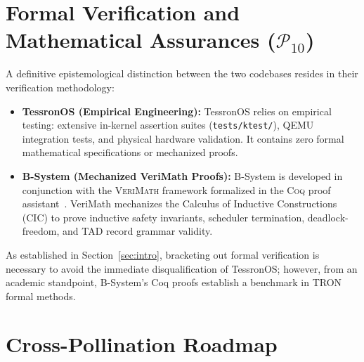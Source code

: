 \documentclass[10pt,journal,compsoc,twocolumn]{article}
\begin{document}
\section{Formal Verification and Mathematical Assurances ($\mathcal{P}_{10}$)}
\label{sec:formal}

A definitive epistemological distinction between the two codebases resides in their verification methodology:
\begin{itemize}[leftmargin=*]
    \item \textbf{TessronOS (Empirical Engineering):} TessronOS relies on empirical testing: extensive in-kernel assertion suites (\texttt{tests/ktest/}), QEMU integration tests, and physical hardware validation. It contains zero formal mathematical specifications or mechanized proofs.
    \item \textbf{B-System (Mechanized VeriMath Proofs):} B-System is developed in conjunction with the \textsc{VeriMath} framework formalized in the \textsc{Coq} proof assistant~\cite{sokhatsky2026verimath}. VeriMath mechanizes the Calculus of Inductive Constructions (CIC) to prove inductive safety invariants, scheduler termination, deadlock-freedom, and TAD record grammar validity.
\end{itemize}

As established in Section~\ref{sec:intro}, bracketing out formal verification is necessary to avoid the immediate disqualification of TessronOS; however, from an academic standpoint, B-System's Coq proofs establish a benchmark in TRON formal methods.

\section{Cross-Pollination Roadmap}
\label{sec:roadmap}
\end{document}
